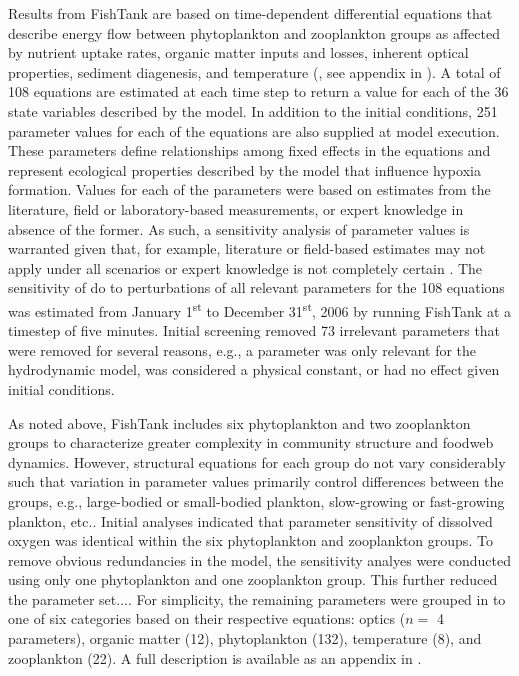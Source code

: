 \documentclass[letterpaper,12pt,oneside]{article}\usepackage[]{graphicx}\usepackage[]{color}
\begin{document}
Results from FishTank are based on time-dependent differential equations that describe energy flow between phytoplankton and zooplankton groups as affected by nutrient uptake rates, organic matter inputs and losses, inherent optical properties, sediment diagenesis, and temperature (\citealt{Penta08,Eldridge10}, see appendix in ).  A total of 108 equations are estimated at each time step to return a value for each of the 36 state variables described by the model.  In addition to the initial conditions, 251 parameter values for each of the equations are also supplied at model execution.  These parameters define relationships among fixed effects in the equations and represent ecological properties described by the model that influence hypoxia formation.  Values for each of the parameters were based on estimates from the literature, field or laboratory-based measurements, or expert knowledge in absence of the former.  As such, a sensitivity analysis of parameter values is warranted given that, for example, literature or field-based estimates may not apply under all scenarios or expert knowledge is not completely certain \citep{Refsgaard07}.  The sensitivity of \ac{do} to perturbations of all relevant parameters for the 108 equations was estimated from January 1\textsuperscript{st} to December 31\textsuperscript{st}, 2006 by running FishTank at a timestep of five minutes.  Initial screening removed 73 irrelevant parameters that were removed for several reasons, e.g., a parameter was only relevant for the hydrodynamic model, was considered a physical constant, or had no effect given initial conditions.  




As noted above, FishTank includes six phytoplankton and two zooplankton groups to characterize greater complexity in community structure and foodweb dynamics.  However, structural equations for each group do not vary considerably such that variation in parameter values primarily control differences between the groups, e.g., large-bodied or small-bodied plankton, slow-growing or fast-growing plankton, etc..  Initial analyses indicated that parameter sensitivity of dissolved oxygen was identical within the six phytoplankton and zooplankton groups.  To remove obvious redundancies in the model, the sensitivity analyes were conducted using only one phytoplankton and one zooplankton group.  This further reduced the parameter set....  For simplicity, the remaining parameters were grouped in  to one of six categories based on their respective equations: optics ($n = $ 4 parameters), organic matter (12), phytoplankton (132), temperature (8), and zooplankton (22).  A full description is available as an appendix in .  
\end{document}
